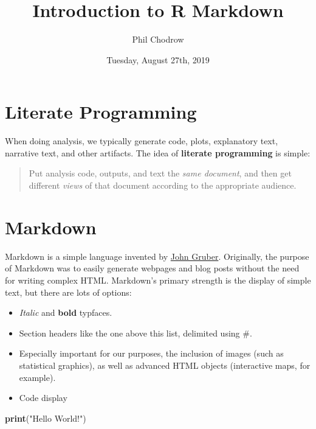 \documentclass[]{article}
\title{Introduction to R Markdown}
\author{Phil Chodrow}
\date{Tuesday, August 27th, 2019}
\newenvironment{Shaded}{\begin{snugshade}}{\end{snugshade}}
\newcommand{\KeywordTok}[1]{\textcolor[rgb]{0.13,0.29,0.53}{\textbf{#1}}}
\newcommand{\NormalTok}[1]{#1}
\newcommand{\StringTok}[1]{\textcolor[rgb]{0.31,0.60,0.02}{#1}}
\providecommand{\tightlist}{%
  \setlength{\itemsep}{0pt}\setlength{\parskip}{0pt}}
\begin{document}
\maketitle

{
\setcounter{tocdepth}{2}
\tableofcontents
}
\hypertarget{literate-programming}{%
\section{Literate Programming}\label{literate-programming}}

When doing analysis, we typically generate code, plots, explanatory
text, narrative text, and other artifacts. The idea of \textbf{literate
programming} is simple:

\begin{quote}
Put analysis code, outputs, and text the \emph{same document}, and then
get different \emph{views} of that document according to the appropriate
audience.
\end{quote}

\hypertarget{markdown}{%
\section{Markdown}\label{markdown}}

Markdown is a simple language invented by
\href{https://daringfireball.net/projects/markdown/}{John Gruber}.
Originally, the purpose of Markdown was to easily generate webpages and
blog posts without the need for writing complex HTML. Markdown's primary
strength is the display of simple text, but there are lots of options:

\begin{itemize}
\tightlist
\item
  \emph{Italic} and \textbf{bold} typfaces.
\item
  Section headers like the one above this list, delimited using \#.
\item
  Especially important for our purposes, the inclusion of images (such
  as statistical graphics), as well as advanced HTML objects
  (interactive maps, for example).
\item
  Code display
\end{itemize}

\begin{Shaded}
\begin{Highlighting}[]
\KeywordTok{print}\NormalTok{(}\StringTok{"Hello World!"}\NormalTok{)}
\end{Highlighting}
\end{Shaded}
\end{document}

